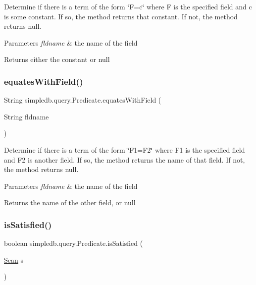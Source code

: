 Determine if there is a term of the form \char`\"{}\+F=c\char`\"{} where F is the specified field and c is some constant. If so, the method returns that constant. If not, the method returns null. 
\begin{DoxyParams}{Parameters}
{\em fldname} & the name of the field \\
\hline
\end{DoxyParams}
\begin{DoxyReturn}{Returns}
either the constant or null 
\end{DoxyReturn}
\mbox{\label{classsimpledb_1_1query_1_1Predicate_a8d615e9ed4f49a5e6fe8ad0f245f5ba7}} 
\subsubsection{\texorpdfstring{equates\+With\+Field()}{equatesWithField()}}
{\footnotesize\ttfamily String simpledb.\+query.\+Predicate.\+equates\+With\+Field (\begin{DoxyParamCaption}\item[{String}]{fldname }\end{DoxyParamCaption})\hspace{0.3cm}{\ttfamily [inline]}}

Determine if there is a term of the form \char`\"{}\+F1=\+F2\char`\"{} where F1 is the specified field and F2 is another field. If so, the method returns the name of that field. If not, the method returns null. 
\begin{DoxyParams}{Parameters}
{\em fldname} & the name of the field \\
\hline
\end{DoxyParams}
\begin{DoxyReturn}{Returns}
the name of the other field, or null 
\end{DoxyReturn}
\mbox{\label{classsimpledb_1_1query_1_1Predicate_a5dec40f471ec4552ef01fba7cf5d51cf}} 
\subsubsection{\texorpdfstring{is\+Satisfied()}{isSatisfied()}}
{\footnotesize\ttfamily boolean simpledb.\+query.\+Predicate.\+is\+Satisfied (\begin{DoxyParamCaption}\item[{\hyperlink{interfacesimpledb_1_1query_1_1Scan}{Scan}}]{s }\end{DoxyParamCaption})\hspace{0.3cm}{\ttfamily [inline]}}

